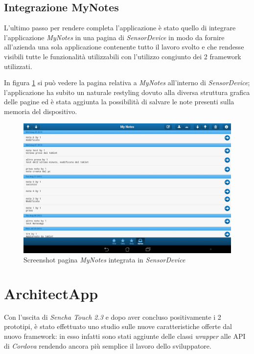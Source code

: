 \subsection{Integrazione MyNotes}
L'ultimo passo per rendere completa l'applicazione è stato quello di integrare l'applicazione \emph{MyNotes} in una pagina di \emph{SensorDevice} in modo da fornire all'azienda una sola applicazione contenente tutto il lavoro svolto e che rendesse visibili tutte le funzionalità utilizzabili con l'utilizzo congiunto dei 2 framework utilizzati.

In figura \ref{fig:screenshot mynotes sensordevice} si può vedere la pagina relativa a \emph{MyNotes} all'interno di \emph{SensorDevice}; l'applicazione ha subito un naturale restyling dovuto alla diversa struttura grafica delle pagine ed è stata aggiunta la possibilità di salvare le note presenti sulla memoria del dispositivo.

\begin{figure}[htb]
\centering
\includegraphics[scale=0.25]{gfx/screenshot/screen_sensor_myNotes}
\caption{Screenshot pagina \emph{MyNotes} integrata in \emph{SensorDevice}}
\label{fig:screenshot mynotes sensordevice}
\end{figure}

\section{ArchitectApp}
Con l'uscita di \emph{Sencha Touch 2.3} e dopo aver concluso positivamente i 2 prototipi, è stato effettuato uno studio sulle nuove caratteristiche offerte dal nuovo framework: in esso infatti sono stati aggiunte delle classi \emph{wrapper} alle \ac{API} di \emph{Cordova} rendendo ancora più semplice il lavoro dello sviluppatore.

